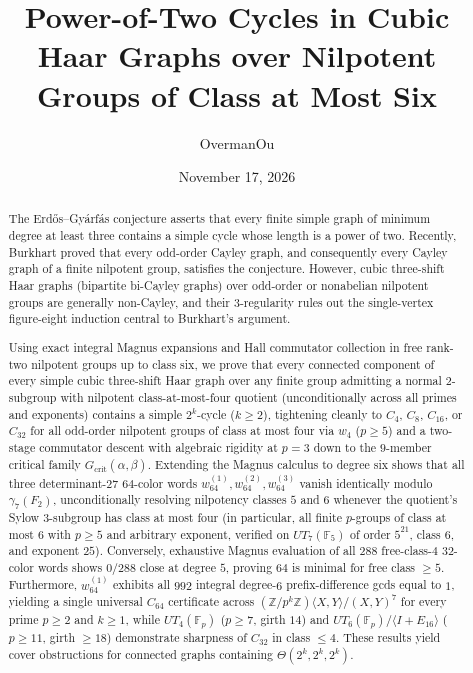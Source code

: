 \documentclass[11pt]{amsart}
\title[Power-of-Two Cycles in Nilpotent Cubic Haar Graphs]{Power-of-Two Cycles in Cubic Haar Graphs over Nilpotent Groups of Class at Most Six}
\author{OvermanOu}
\date{November 17, 2026}
\theoremstyle{definition}
\theoremstyle{remark}
\newcommand{\F}{\mathbb{F}}
\newcommand{\Z}{\mathbb{Z}}
\begin{document}
\begin{abstract}
The Erd\H{o}s--Gy\'arf\'as conjecture asserts that every finite simple graph of minimum degree at least three contains a simple cycle whose length is a power of two. Recently, Burkhart proved that every odd-order Cayley graph, and consequently every Cayley graph of a finite nilpotent group, satisfies the conjecture. However, cubic three-shift Haar graphs (bipartite bi-Cayley graphs) over odd-order or nonabelian nilpotent groups are generally non-Cayley, and their $3$-regularity rules out the single-vertex figure-eight induction central to Burkhart's argument.

Using exact integral Magnus expansions and Hall commutator collection in free rank-two nilpotent groups up to class six, we prove that every connected component of every simple cubic three-shift Haar graph over any finite group admitting a normal $2$-subgroup with nilpotent class-at-most-four quotient (unconditionally across all primes and exponents) contains a simple $2^k$-cycle ($k \ge 2$), tightening cleanly to $C_4$, $C_8$, $C_{16}$, or $C_{32}$ for all odd-order nilpotent groups of class at most four via $w_4$ ($p \ge 5$) and a two-stage commutator descent with algebraic rigidity at $p = 3$ down to the $9$-member critical family $G_{\mathrm{crit}}(\alpha,\beta)$. Extending the Magnus calculus to degree six shows that all three determinant-$27$ $64$-color words $w_{64}^{(1)}, w_{64}^{(2)}, w_{64}^{(3)}$ vanish identically modulo $\gamma_7(F_2)$, unconditionally resolving nilpotency classes $5$ and $6$ whenever the quotient's Sylow $3$-subgroup has class at most four (in particular, all finite $p$-groups of class at most $6$ with $p \ge 5$ and arbitrary exponent, verified on $UT_7(\F_5)$ of order $5^{21}$, class $6$, and exponent $25$). Conversely, exhaustive Magnus evaluation of all $288$ free-class-$4$ $32$-color words shows $0/288$ close at degree $5$, proving $64$ is minimal for free class $\ge 5$. Furthermore, $w_{64}^{(1)}$ exhibits all $992$ integral degree-$6$ prefix-difference gcds equal to $1$, yielding a single universal $C_{64}$ certificate across $(\Z/p^k\Z)\langle X,Y\rangle/(X,Y)^7$ for every prime $p \ge 2$ and $k \ge 1$, while $UT_4(\F_p)$ ($p \ge 7$, girth $14$) and $UT_6(\F_p)/\langle I+E_{16}\rangle$ ($p \ge 11$, girth $\ge 18$) demonstrate sharpness of $C_{32}$ in class $\le 4$. These results yield cover obstructions for connected graphs containing $\Theta(2^k,2^k,2^k)$.
\end{abstract}

\maketitle
\end{document}
